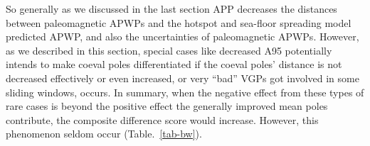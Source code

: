 So generally as we discussed in the last section APP decreases the distances
between paleomagnetic APWPs and the hotspot and sea-floor spreading model
predicted APWP, and also the uncertainties of paleomagnetic APWPs. However, as
we described in this section, special cases like decreased A95 potentially
intends to make coeval poles differentiated if the coeval poles' distance is
not decreased effectively or even increased, or very ``bad'' VGPs got involved
in some sliding windows, occurs. In summary, when the negative effect from
these types of rare cases is beyond the positive effect the generally improved
mean poles contribute, the composite difference score would increase. However,
this phenomenon seldom occur (Table.~\ref{tab-bw}).

\begin{table*}
\centering
\caption{One example of the Type 1 rare cases where AMP gives better similarity
  result than APP does from North America (101). Only statistically significant
  values are listed here.}
\label{tab-w3p4vs5}
\end{table*}
